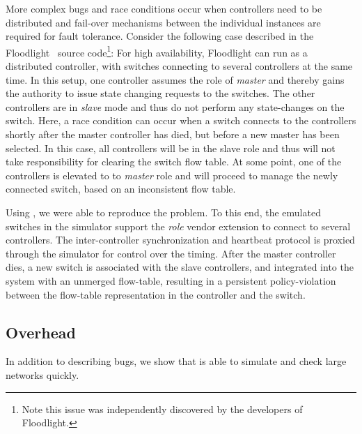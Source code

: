  More complex bugs and race conditions occur when controllers need to be
distributed and fail-over mechanisms between the individual instances are
required for fault tolerance. Consider the following case described in the
Floodlight~\cite{floodlight} source code\footnote{Note this issue was
independently discovered by the developers of Floodlight.}: For high availability, Floodlight can run as a
distributed controller, with switches connecting to several controllers at the
same time. In this setup, one controller assumes the role of \emph{master} and
thereby gains the authority to issue state changing requests to the switches.
The other controllers are in \emph{slave} mode and thus do not perform any
state-changes on the switch. Here, a race condition can occur when a switch
connects to the controllers shortly after the master controller has died, but
before a new master has been selected. In this case, all controllers will be in
the slave role and thus will not take responsibility for clearing the switch
flow table. At some point, one of the controllers is elevated to to
\emph{master} role and will proceed to manage the newly connected switch, based
on an inconsistent flow table.

Using \projectname, we were able to reproduce the problem. To this end, the
emulated switches in the simulator support the \emph{role} vendor extension to
connect to several controllers. The inter-controller synchronization and heartbeat
protocol is proxied through the simulator for control over the timing. After the
master controller dies, a new switch is associated with the slave controllers, and
integrated into the system with an unmerged flow-table, resulting in a persistent
policy-violation between the flow-table representation in the controller and the switch.

\subsection{Overhead}

In addition to describing bugs, we show that \projectname{} is able 
to simulate and check large networks quickly.

